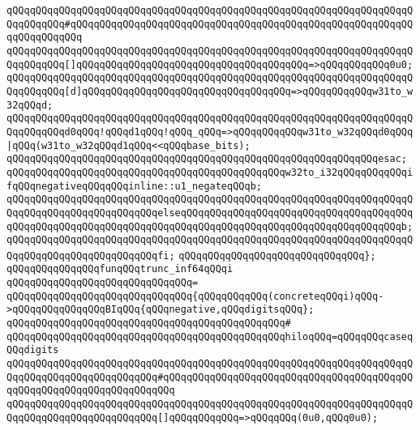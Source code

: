 \verb|qQQqqQQqqQQqqQQqqQQqqQQqqQQqqQQqqQQqqQQqqQQqqQQqqQQqqQQqqQQqqQQqqQQqqQQqqQQqqQQq#qQQqqQQqqQQqqQQqqQQqqQQqqQQqqQQqqQQqqQQqqQQqqQQqqQQqqQQqqQQqqQQqqQQqqQQq|\newline
\verb|qQQqqQQqqQQqqQQqqQQqqQQqqQQqqQQqqQQqqQQqqQQqqQQqqQQqqQQqqQQqqQQqqQQqqQQqqQQqqQQq[]qQQqqQQqqQQqqQQqqQQqqQQqqQQqqQQqqQQqqQQq=>qQQqqQQqqQQq0u0;|\newline
\verb|qQQqqQQqqQQqqQQqqQQqqQQqqQQqqQQqqQQqqQQqqQQqqQQqqQQqqQQqqQQqqQQqqQQqqQQqqQQqqQQq[d]qQQqqQQqqQQqqQQqqQQqqQQqqQQqqQQqqQQq=>qQQqqQQqqQQqw31to_w32qQQqd;|\newline
\verb|qQQqqQQqqQQqqQQqqQQqqQQqqQQqqQQqqQQqqQQqqQQqqQQqqQQqqQQqqQQqqQQqqQQqqQQqqQQqqQQqd0qQQq!qQQqd1qQQq!qQQq_qQQq=>qQQqqQQqqQQqw31to_w32qQQqd0qQQq|\verb#|qQQq(w31to_w32qQQqd1qQQq<<qQQqbase_bits);#\newline
\verb|qQQqqQQqqQQqqQQqqQQqqQQqqQQqqQQqqQQqqQQqqQQqqQQqqQQqqQQqqQQqqQQqesac;|\newline
\newline
\verb|qQQqqQQqqQQqqQQqqQQqqQQqqQQqqQQqqQQqqQQqqQQqqQQqw32to_i32qQQqqQQqqQQqifqQQqnegativeqQQqqQQqinline::u1_negateqQQqb;|\newline
\verb|qQQqqQQqqQQqqQQqqQQqqQQqqQQqqQQqqQQqqQQqqQQqqQQqqQQqqQQqqQQqqQQqqQQqqQQqqQQqqQQqqQQqqQQqqQQqqQQqelseqQQqqQQqqQQqqQQqqQQqqQQqqQQqqQQqqQQqqQQqqQQqqQQqqQQqqQQqqQQqqQQqqQQqqQQqqQQqqQQqqQQqqQQqqQQqqQQqqQQqqQQqqQQqb;|\newline
\verb|qQQqqQQqqQQqqQQqqQQqqQQqqQQqqQQqqQQqqQQqqQQqqQQqqQQqqQQqqQQqqQQqqQQqqQQqqQQqqQQqqQQqqQQqqQQqqQQqfi;|\newline
\verb|qQQqqQQqqQQqqQQqqQQqqQQqqQQqqQQq};|\newline
\newline
\verb|qQQqqQQqqQQqqQQqfunqQQqtrunc_inf64qQQqi|\newline
\verb|qQQqqQQqqQQqqQQqqQQqqQQqqQQqqQQq=|\newline
\verb|qQQqqQQqqQQqqQQqqQQqqQQqqQQqqQQq{qQQqqQQqqQQq(concreteqQQqi)qQQq->qQQqqQQqqQQqqQQqBIqQQq{qQQqnegative,qQQqdigitsqQQq};|\newline
\verb|qQQqqQQqqQQqqQQqqQQqqQQqqQQqqQQqqQQqqQQqqQQqqQQq#|\newline
\verb|qQQqqQQqqQQqqQQqqQQqqQQqqQQqqQQqqQQqqQQqqQQqqQQqhiloqQQq=qQQqqQQqcaseqQQqdigits|\newline
\verb|qQQqqQQqqQQqqQQqqQQqqQQqqQQqqQQqqQQqqQQqqQQqqQQqqQQqqQQqqQQqqQQqqQQqqQQqqQQqqQQqqQQqqQQqqQQqqQQq#qQQqqQQqqQQqqQQqqQQqqQQqqQQqqQQqqQQqqQQqqQQqqQQqqQQqqQQqqQQqqQQqqQQqqQQq|\newline
\verb|qQQqqQQqqQQqqQQqqQQqqQQqqQQqqQQqqQQqqQQqqQQqqQQqqQQqqQQqqQQqqQQqqQQqqQQqqQQqqQQqqQQqqQQqqQQqqQQq[]qQQqqQQqqQQq=>qQQqqQQq(0u0,qQQq0u0);|\newline
